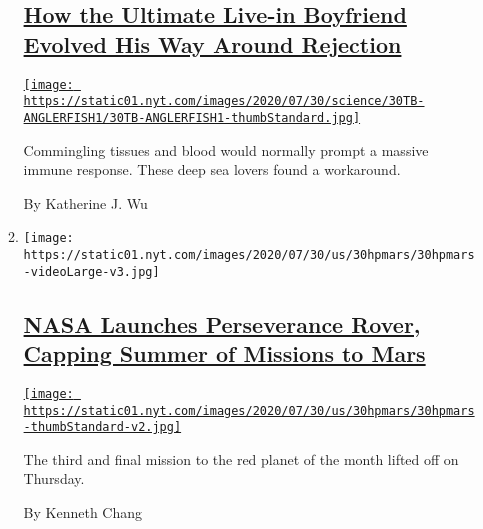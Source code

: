 \begin{enumerate}
\begin{enumerate}
    \hypertarget{how-the-ultimate-live-in-boyfriend-evolved-his-way-around-rejection}{%
    \subsection{\texorpdfstring{\href{/2020/07/30/science/anglerfish-immune-rejection.html}{How
    the Ultimate Live-in Boyfriend Evolved His Way Around
    Rejection}}{How the Ultimate Live-in Boyfriend Evolved His Way Around Rejection}}\label{how-the-ultimate-live-in-boyfriend-evolved-his-way-around-rejection}}

    \href{/2020/07/30/science/anglerfish-immune-rejection.html}{\texttt{[image: https://static01.nyt.com/images/2020/07/30/science/30TB-ANGLERFISH1/30TB-ANGLERFISH1-thumbStandard.jpg]}}

    Commingling tissues and blood would normally prompt a massive immune
    response. These deep sea lovers found a workaround.

    By Katherine J. Wu
  \item
    \texttt{[image: https://static01.nyt.com/images/2020/07/30/us/30hpmars/30hpmars-videoLarge-v3.jpg]}

    \hypertarget{nasa-launches-perseverance-rover-capping-summer-of-missions-to-mars}{%
    \subsection{\texorpdfstring{\href{/2020/07/30/science/nasa-mars-launch.html}{NASA
    Launches Perseverance Rover, Capping Summer of Missions to
    Mars}}{NASA Launches Perseverance Rover, Capping Summer of Missions to Mars}}\label{nasa-launches-perseverance-rover-capping-summer-of-missions-to-mars}}

    \href{/2020/07/30/science/nasa-mars-launch.html}{\texttt{[image: https://static01.nyt.com/images/2020/07/30/us/30hpmars/30hpmars-thumbStandard-v2.jpg]}}

    The third and final mission to the red planet of the month lifted
    off on Thursday.

    By Kenneth Chang
  \end{enumerate}
\end{enumerate}

